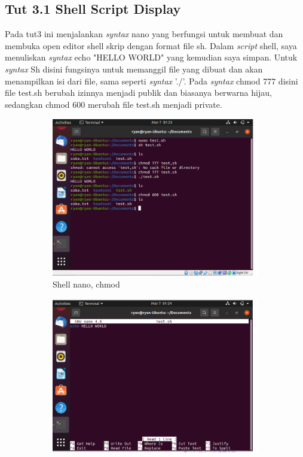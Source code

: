 \documentclass[11pt,a4paper]{article}
\begin{document}
\subsection{Tut 3.1 Shell Script Display}
    Pada tut3 ini menjalankan \textit{syntax} nano yang berfungsi untuk membuat dan membuka open editor shell skrip dengan format file sh. Dalam \textit{script} shell, saya menuliskan \textit{syntax} echo "HELLO WORLD" yang kemudian saya simpan. Untuk \textit{syntax} Sh disini fungsinya untuk memanggil file yang dibuat dan akan menampilkan isi dari file, sama seperti \textit{syntax} './'. Pada \textit{syntax} chmod 777 disini file test.sh berubah izinnya menjadi publik dan biasanya berwarna hijau, sedangkan chmod 600 merubah file test.sh menjadi private.
    \begin{figure}[h]
	\centering
	\begin{subfigure}[b]{0.4\textwidth}
		\centering
		\def\svgwidth{\columnwidth}
		\includegraphics[width=1\textwidth]{Gambar/tut 3 shell command.png}
		\caption{Shell nano, chmod}
		\label{fig:aug-1}
	\end{subfigure}
	\qquad %
	\begin{subfigure}[b]{0.4\textwidth}
		\centering
		\def\svgwidth{\columnwidth}
		\includegraphics[width=1\textwidth]{Gambar/tut 3 shell script.png}

\end{subfigure}
\end{figure}
\end{document}
